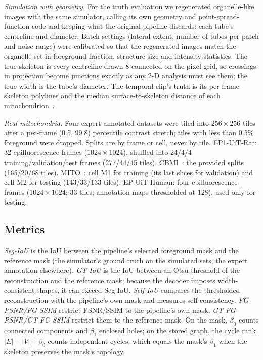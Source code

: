 \documentclass[10pt,a4paper]{article}
\begin{document}
\emph{Simulation with geometry.} For the truth evaluation we regenerated
organelle-like images with the same simulator, calling its own geometry and
point-spread-function code and keeping what the original pipeline discards:
each tube's centreline and diameter. Batch settings (lateral extent, number
of tubes per patch and noise range) were calibrated so that the regenerated
images match the organelle set in foreground fraction, structure size and
intensity statistics. The true skeleton is every centreline drawn
8-connected on the pixel grid, so crossings in projection become junctions
exactly as any 2-D analysis must see them; the true width is the tube's
diameter. The temporal clip's truth is its per-frame skeleton polylines and
the median surface-to-skeleton distance of each mitochondrion~\cite{cods}.

\emph{Real mitochondria.} Four expert-annotated datasets were tiled into
$256\times256$ tiles after a per-frame (0.5, 99.8) percentile contrast
stretch; tiles with less than 0.5\% foreground were dropped. Splits are by
frame or cell, never by tile. EP1-UiT-Rat: 32 epifluorescence frames
($1024\times1024$), shuffled into 24/4/4 training/validation/test frames
(277/44/45 tiles). CBMI~\cite{cbmi}: the provided splits (165/20/68 tiles).
MITO~\cite{zhanghao2023mito}: cell M1 for training (its last slices for
validation) and cell M2 for testing (143/33/133 tiles). EP-UiT-Human: four
epifluorescence frames ($1024\times1024$; 33 tiles; annotation maps
thresholded at 128), used only for testing.

\subsection{Metrics}\label{sec:metrics}
\emph{Seg-IoU} is the IoU between the pipeline's selected foreground mask
and the reference mask (the simulator's ground truth on the simulated sets,
the expert annotation elsewhere). \emph{GT-IoU} is the IoU between an Otsu
threshold of the reconstruction and the reference mask; because the decoder
imposes width-consistent shapes, it can exceed Seg-IoU. \emph{Self-IoU}
compares the thresholded reconstruction with the pipeline's own mask and
measures self-consistency. \emph{FG-PSNR/FG-SSIM} restrict PSNR/SSIM to the
pipeline's own mask; \emph{GT-FG-PSNR/GT-FG-SSIM} restrict them to the
reference mask. On the mask, $\beta_0$ counts connected components and
$\beta_1$ enclosed holes; on the stored graph, the cycle rank
$|E|-|V|+\beta_0$ counts independent cycles, which equals the mask's
$\beta_1$ when the skeleton preserves the mask's topology.
\end{document}
